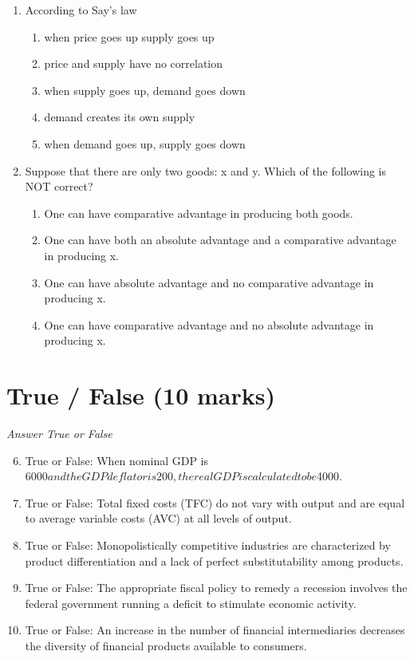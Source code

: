 \documentclass[12pt]{article}
\begin{document}
\begin{enumerate}[label=\arabic*.]
\begin{enumerate}[label=(\alph*)]
\end{enumerate}
\item According to Say's law
\begin{enumerate}[label=(\alph*)]
    \item when price goes up supply goes up
    \item price and supply have no correlation
    \item when supply goes up, demand goes down
    \item demand creates its own supply
    \item when demand goes up, supply goes down
\end{enumerate}
\item Suppose that there are only two goods: x and y. Which of the following is NOT correct?
\begin{enumerate}[label=(\alph*)]
    \item One can have comparative advantage in producing both goods.
    \item One can have both an absolute advantage and a comparative advantage in producing x.
    \item One can have absolute advantage and no comparative advantage in producing x.
    \item One can have comparative advantage and no absolute advantage in producing x.
\end{enumerate}
\end{enumerate}

\section*{True / False (10 marks)}
\textit{Answer True or False}
\begin{enumerate}[label=\arabic*.]
\setcounter{enumi}{5}
\item True or False: When nominal GDP is $6000 and the GDP deflator is 200, the real GDP is calculated to be $4000.
\item True or False: Total fixed costs (TFC) do not vary with output and are equal to average variable costs (AVC) at all levels of output.
\item True or False: Monopolistically competitive industries are characterized by product differentiation and a lack of perfect substitutability among products.
\item True or False: The appropriate fiscal policy to remedy a recession involves the federal government running a deficit to stimulate economic activity.
\item True or False: An increase in the number of financial intermediaries decreases the diversity of financial products available to consumers.
\end{enumerate}
\end{document}

